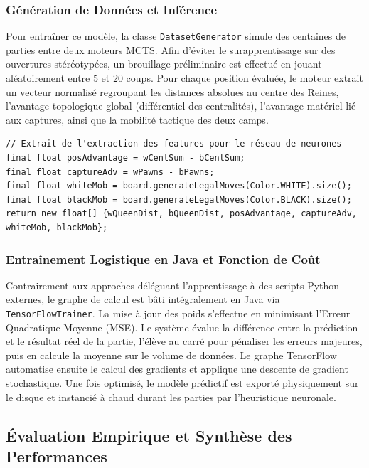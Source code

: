 \documentclass[a4paper]{article}
\begin{document}
\subsubsection{Génération de Données et Inférence}
Pour entraîner ce modèle, la classe \texttt{DatasetGenerator} simule des centaines de parties entre deux moteurs MCTS. Afin d'éviter le surapprentissage sur des ouvertures stéréotypées, un brouillage préliminaire est effectué en jouant aléatoirement entre 5 et 20 coups. Pour chaque position évaluée, le moteur extrait un vecteur normalisé regroupant les distances absolues au centre des Reines, l'avantage topologique global (différentiel des centralités), l'avantage matériel lié aux captures, ainsi que la mobilité tactique des deux camps.

\begin{verbatim}
// Extrait de l'extraction des features pour le réseau de neurones
final float posAdvantage = wCentSum - bCentSum;
final float captureAdv = wPawns - bPawns;
final float whiteMob = board.generateLegalMoves(Color.WHITE).size();
final float blackMob = board.generateLegalMoves(Color.BLACK).size();
return new float[] {wQueenDist, bQueenDist, posAdvantage, captureAdv, whiteMob, blackMob};
\end{verbatim}

\subsubsection{Entraînement Logistique en Java et Fonction de Coût}
Contrairement aux approches déléguant l'apprentissage à des scripts Python externes, le graphe de calcul est bâti intégralement en Java via \texttt{TensorFlowTrainer}. La mise à jour des poids s'effectue en minimisant l'Erreur Quadratique Moyenne (MSE). Le système évalue la différence entre la prédiction et le résultat réel de la partie, l'élève au carré pour pénaliser les erreurs majeures, puis en calcule la moyenne sur le volume de données. Le graphe TensorFlow automatise ensuite le calcul des gradients et applique une descente de gradient stochastique. Une fois optimisé, le modèle prédictif est exporté physiquement sur le disque et instancié à chaud durant les parties par l'heuristique neuronale.

\subsection{Évaluation Empirique et Synthèse des Performances}
\end{document}
